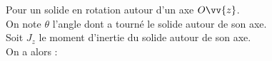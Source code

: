 \documentclass[a4paper]{article}
\begin{document}
\pagestyle{fancy}
\fancyhf{}
\setlength{\headheight}{15pt}

\begin{center}
	\large{}
\end{center}


Pour un solide en rotation autour d'un axe \(O\vv{z}\). \\
On note \(\theta\) l'angle dont a tourné le solide autour de son axe.\\
Soit \(J_z\) le moment d'inertie du solide autour de son axe.\\
On a alors :
\begin{center}\end{center}
\end{document}
